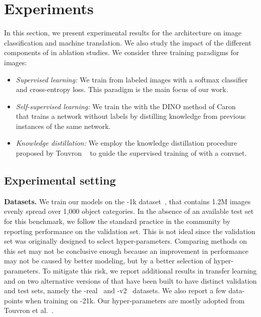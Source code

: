 
\section{Experiments}

In this section, we present experimental results for the \OURS architecture on image  classification and machine translation. 
We also study the impact of the different components of \OURS in ablation studies.
We consider three training paradigms for images:
\begin{itemize}[leftmargin=*]
\item
\emph{Supervised learning:} We train \OURS  from labeled images with a softmax classifier  and cross-entropy loss. This paradigm is the main focus of our work. 
\item \emph{Self-supervised learning:} We train the \OURS with the DINO method of Caron~\etal~\cite{caron2021emerging} that trains a network without labels by distilling knowledge from previous instances of the same network.
\item \emph{Knowledge distillation:} We employ the knowledge distillation procedure proposed by Touvron \etal~\cite{Touvron2020TrainingDI} to guide the supervised training of \OURS with a convnet. 
\end{itemize}


\subsection{Experimental setting}
\label{sec:experimental_setting}

\textbf{Datasets.} 
We train our models on the \ImNet-1k dataset~\cite{Russakovsky2015ImageNet12}, that contains 1.2M images evenly spread over 1,000 object categories. 
In the absence of an available test set for this benchmark, we follow the standard practice in the community by reporting performance on the validation set.
This is not ideal since the validation set was originally designed to select hyper-parameters.
Comparing methods on this set may not be conclusive enough because an improvement in performance may not be caused by better modeling, but by a better selection of hyper-parameters.
To mitigate this risk, we report additional results in transfer learning and on two alternative versions of \ImNet that have been built to have distinct validation and test sets, namely the \ImNet-real~\cite{Beyer2020ImageNetReal} and \ImNet-v2~\cite{Recht2019ImageNetv2} datasets. We also report a few data-points when training on \ImNet-21k. 
Our hyper-parameters are mostly adopted from Touvron et al.~\cite{Touvron2020TrainingDI,touvron2021going}. 




